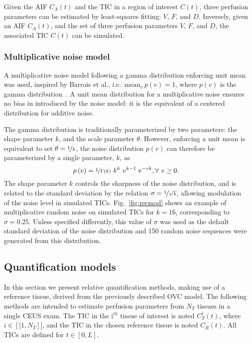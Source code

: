 Given the AIF $C_A(t)$ and the TIC in a region of interest $C(t)$, three perfusion parameters can be estimated by least-squares fitting: $V$, $F$, and $D$.
Inversely, given an AIF $C_A(t)$, and the set of three perfusion parameters $V$, $F$, and $D$, the associated TIC $C(t)$ can be simulated.

\subsubsection{Multiplicative noise model}\label{sec:NoiseModel}
A multiplicative noise model following a gamma distribution enforcing unit mean was used, inspired by Barrois et al., i.e.~$\mathrm{mean}_v~p\left(v\right) = 1$, where $p\left(v\right)$ is the gamma distribution~\cite{Barrois2013}.
A unit mean distribution for a multiplicative noise ensures no bias in introduced by the noise model: it is the equivalent of a centered distribution for additive noise.

The gamma distribution is traditionally parameterized by two parameters: the shape parameter $k$, and the scale parameter $\theta$.
However, enforcing a unit mean is equivalent to set $\theta = \nicefrac{1}{k}$, the noise distribution $p\left(v\right)$ can therefore be parameterized by a single parameter, $k$, as
\begin{equation}
p\left(v\right) = \nicefrac{1}{\Gamma\left(k\right)} ~ k^k ~ v^{k-1} ~ \mathrm e^{-vk}, \forall~v \geq 0.
\end{equation}
The shape parameter $k$ controls the sharpness of the noise distribution, and is related to the standard deviation by the relation $\sigma = \nicefrac{1}{\sqrt{k}}$, allowing modulation of the noise level in simulated TICs.
Fig.~\ref{fig:recmod} shows an example of multiplicative random noise on simulated TICs for $k = 16$, corresponding to $\sigma = 0.25$.
Unless specified differently, this value of $\sigma$ was used as the default standard deviation of the noise distribution and 150 random noise sequences were generated from this distribution.

\subsection{Quantification models}
In this section we present relative quantification methods, making use of a reference tissue, derived from the previously described OVC model. 
The following methods are intended to estimate perfusion parameters from $N_T$ tissues in a single CEUS exam.
The TIC in the i$^{th}$ tissue of interest is noted $C_T^i(t)$, where $i \in \left[\![1,N_T \right]\!]$, and the TIC in the chosen reference tissue is noted $C_R(t)$. All TICs are defined for $t \in \left[ 0, L \right]$.

